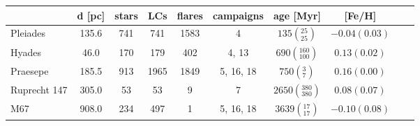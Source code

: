 \begin{tabular}{lccccccccr}
\hline\hline
          &  d [pc] &  stars &   LCs &  flares &    campaigns &                        age [Myr] &         [Fe/H] \\
\hline
 Pleiades &   135.6 &    741 &   741 &    1583 &            4 &     $135\left(_{25}^{25}\right)$ &  $-0.04(0.03)$ \\
   Hyades &    46.0 &    170 &   179 &     402 &      4, 13 &   $690\left(_{100}^{160}\right)$ &   $0.13(0.02)$ \\
 Praesepe &   185.5 &    913 &  1965 &    1849 &  5, 16, 18 &       $750\left(_{7}^{3}\right)$ &   $0.16(0.00)$ \\
  Ruprecht 147 &   305.0 &     53 &    53 &       9 &            7 &  $2650\left(_{380}^{380}\right)$ &   $0.08(0.07)$ \\
      M67 &   908.0 &    234 &   497 &       1 &  5, 16, 18 &    $3639\left(_{17}^{17}\right)$ &  $-0.10(0.08)$ \\
\hline

\end{tabular}
